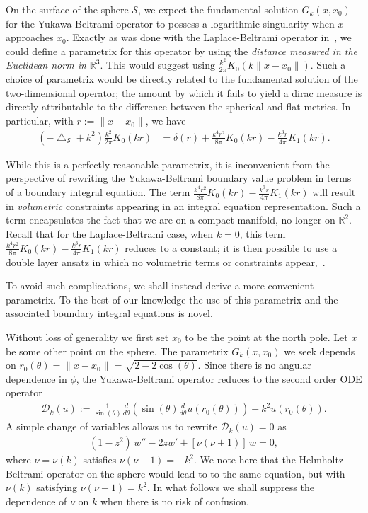 \documentclass[final]{siamltex}
\newcommand{\lap}{\bigtriangleup}
\renewcommand{\S} {\mathcal{S}}
\begin{document}
On the surface of the sphere $\S$, we expect the fundamental solution
$G_k(x,x_{0})$ for the Yukawa-Beltrami operator to possess a
logarithmic singularity when $x$ approaches $x_{0}$. Exactly as was
done  with the Laplace-Beltrami operator in~\cite{gemmrich}, we could
define a parametrix for this operator by using the {\it distance
measured in the Euclidean norm in $\mathbb{R}^3$}. This would suggest
using $ \frac{k^2}{2\pi}K_0(k\|x-x_{0}\|)$.  Such a choice of
parametrix would be directly related to the fundamental solution of the
two-dimensional operator; the amount by which it fails to yield a dirac
measure is directly attributable to the difference between the
spherical and flat metrics.  In particular, with $r:=\|x-x_{0}\|$, we
have
\begin{align*}
  (-\lap_{\S} + k^{2})\frac{k^2}{2\pi}K_0(kr)&=
    \delta(r) 
    +\frac{k^{4}r^{2}}{8\pi}K_{0}(kr) - \frac{k^{3}r}{4\pi}K_{1}(kr).
\end{align*}

While this is a perfectly reasonable parametrix, it is inconvenient from
the perspective of rewriting the Yukawa-Beltrami boundary value problem
in terms of a boundary integral equation. The term $\frac{k^{4}r^{2}}{8\pi}K_{0}(kr) - \frac{k^{3}r}{4\pi}K_{1}(kr)$ will result
in {\it volumetric} constraints  appearing in an integral equation
representation. Such a term encapsulates the fact that we are on a
compact manifold, no longer on $\mathbb{R}^2$. Recall that for the
Laplace-Beltrami case, when $k=0$, this term $\frac{k^{4}r^{2}}{8\pi}K_{0}(kr) - \frac{k^{3}r}{4\pi}K_{1}(kr)$ reduces to a
constant; it is then possible to use a double layer ansatz in which no
volumetric terms or constraints appear,~\cite{kro:nig2013}.  

To avoid
such complications, we shall instead derive a more convenient
parametrix. To the best of our knowledge the use of this parametrix and
the associated boundary integral equations is novel. 

Without loss of generality we first set $x_{0}$ to be the point at
the north pole.  Let $x$ be some other point on the sphere. The parametrix $G_k(x,x_0)$ we seek depends on
$r_0(\theta)=\|x-x_0\|=\sqrt{2-2\cos(\theta)} $. Since there is no
angular dependence in $\phi$, the Yukawa-Beltrami operator reduces to
the second order ODE operator
\begin{align*}
\mathcal{D}_k(u):=\frac{1}{\sin(\theta)}\frac{d}{d\theta}\left(\sin(\theta)
\frac{d}{d\theta}u(r_0(\theta))\right)-k^2 u(r_{0}(\theta)).
\end{align*}
A simple change of variables allows us to rewrite $\mathcal{D}_k (u)=0$
as 
\begin{align}
  \label{LegendrePequation}
  (1-z^2)\,w'' -2zw' + \left[\nu(\nu+1)\right]\,w = 0,
\end{align}
where $\nu = \nu(k)$ satisfies $\nu(\nu + 1) = -k^2$. We note here that
the Helmholtz-Beltrami operator on the sphere would lead to to the same
equation, but with $\nu(k)$ satisfying $\nu(\nu+1)=k^{2}$. In what
follows we shall suppress the dependence of $\nu$ on $k$ when there is
no risk of confusion.
\end{document}
